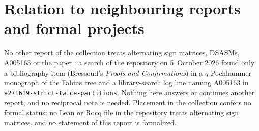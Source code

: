 \documentclass[11pt,letterpaper]{article}
\theoremstyle{remark}\newtheorem{remark}[theorem]{Remark}
\newcommand{\file}[1]{\nolinkurl{#1}}
\begin{document}
\section*{Relation to neighbouring reports and formal projects}\label{dsasm:sec:neighbours}
No other report of the collection treats alternating sign matrices, DSASMs, A005163 or the paper \cite{bfk}: a search of the repository on 5~October 2026 found only a bibliography item (Bressoud's \emph{Proofs and Confirmations}) in a $q$-Pochhammer monograph of the Fabius tree and a library-search log line naming A005163 in \file{a271619-strict-twice-partitions}. Nothing here answers or continues another report, and no reciprocal note is needed. Placement in the collection confers no formal status: no Lean or Rocq file in the repository treats alternating sign matrices, and no statement of this report is formalized.
\clearpage
\end{document}
